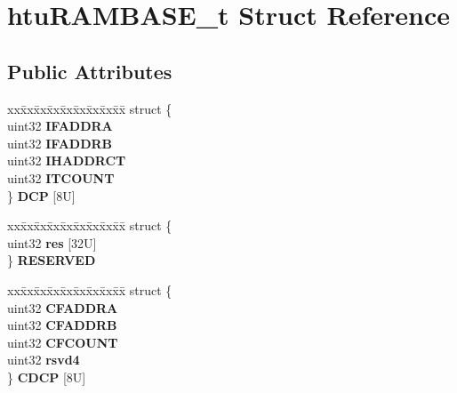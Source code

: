\hypertarget{structhtuRAMBASE__t}{}\section{htu\+R\+A\+M\+B\+A\+S\+E\+\_\+t Struct Reference}
\label{structhtuRAMBASE__t}
\subsection*{Public Attributes}
\begin{DoxyCompactItemize}
\item 
\mbox{\label{structhtuRAMBASE__t_a7d95d6729e248353cdd01566ae854ad4}} 
\begin{tabbing}
xx\=xx\=xx\=xx\=xx\=xx\=xx\=xx\=xx\=\kill
struct \{\\
\>uint32 {\bfseries IFADDRA}\\
\>uint32 {\bfseries IFADDRB}\\
\>uint32 {\bfseries IHADDRCT}\\
\>uint32 {\bfseries ITCOUNT}\\
\} {\bfseries DCP} \mbox{[}8U\mbox{]}\\

\end{tabbing}\item 
\mbox{\label{structhtuRAMBASE__t_ab33235d0cb470be302f116c6f70e92f7}} 
\begin{tabbing}
xx\=xx\=xx\=xx\=xx\=xx\=xx\=xx\=xx\=\kill
struct \{\\
\>uint32 {\bfseries res} \mbox{[}32U\mbox{]}\\
\} {\bfseries RESERVED}\\

\end{tabbing}\item 
\mbox{\label{structhtuRAMBASE__t_aaf9bc58c369bdd6fe1d2786abebb802b}} 
\begin{tabbing}
xx\=xx\=xx\=xx\=xx\=xx\=xx\=xx\=xx\=\kill
struct \{\\
\>uint32 {\bfseries CFADDRA}\\
\>uint32 {\bfseries CFADDRB}\\
\>uint32 {\bfseries CFCOUNT}\\
\>uint32 {\bfseries rsvd4}\\
\} {\bfseries CDCP} \mbox{[}8U\mbox{]}\\

\end{tabbing}\end{DoxyCompactItemize}


